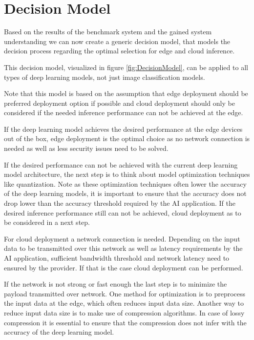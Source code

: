 \section{Decision Model}

Based on the results of the benchmark system and the gained system understanding we can now create a generic decision model, that models the decision process regarding the optimal selection for edge and cloud inference.

This decision model, visualized in figure \ref{fig:DecisionModel}, can be applied to all types of deep learning models, not just image classification models.

Note that this model is based on the assumption that edge deployment should be preferred deployment option if possible and cloud deployment should only be considered if the needed inference performance can not be achieved at the edge.


If the deep learning model achieves the desired performance at the edge devices out of the box, edge deployment is the optimal choice as no network connection is needed as well as less security issues need to be solved.

If the desired performance can not be achieved with the current deep learning model architecture, the next step is to think about model optimization techniques like quantization.
Note as these optimization techniques often lower the accuracy of the deep learning models, it is important to ensure that the accuracy does not drop lower than the accuracy threshold required by the AI application.
If the desired inference performance still can not be achieved, cloud deployment as to be considered in a next step.

For cloud deployment a network connection is needed. Depending on the input data to be transmitted over this network as well as latency requirements by the AI application, sufficient bandwidth threshold and network latency need to ensured by the provider. 
If that is the case cloud deployment can be performed.

If the network is not strong or fast enough the last step is to minimize the payload transmitted over network.
One method for optimization is to preprocess the input data at the edge, which often reduces input data size. 
Another way to reduce input data size is to make use of compression algorithms.
In case of lossy compression it is essential to ensure that the compression does not infer with the accuracy of the deep learning model.

